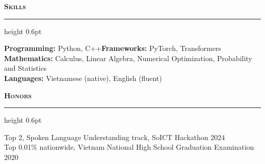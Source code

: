 \documentclass{resume}
\renewenvironment{rSection}[1]{%
  \vspace{0.45em}%
  {\color{accent}\large\scshape\bfseries #1}\par\vspace{0.12em}%
  {\color{accent}\hrule height 0.6pt}\vspace{0.25em}%
  \begin{list}{}{%
    \setlength{\leftmargin}{0em}%
    \setlength{\topsep}{0.3em}%
    \setlength{\partopsep}{0pt}%
    \setlength{\parsep}{0pt}%
    \setlength{\itemsep}{0pt}%
  }%
  \item[]%
}{%
  \end{list}%
}
\newcommand{\sep}{\hspace{0.6em}{\color{muted}$\vert$}\hspace{0.6em}}
\begin{document}

\begin{rSection}{Skills}
\textbf{Programming:} Python, C++\sep\textbf{Frameworks:} PyTorch, Transformers\\
\textbf{Mathematics:} Calculus, Linear Algebra, Numerical Optimization, Probability and Statistics\\
\textbf{Languages:} Vietnamese (native), English (fluent)
\end{rSection}

\begin{rSection}{Honors}
Top 2, Spoken Language Understanding track, SoICT Hackathon \hfill {\color{muted}2024}\\
Top 0.01\% nationwide, Vietnam National High School Graduation Examination \hfill {\color{muted}2020}
\end{rSection}
\end{document}
